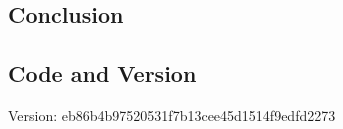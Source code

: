 \subsection{Conclusion}

\subsection{Code and Version}

Version: eb86b4b97520531f7b13cee45d1514f9edfd2273
